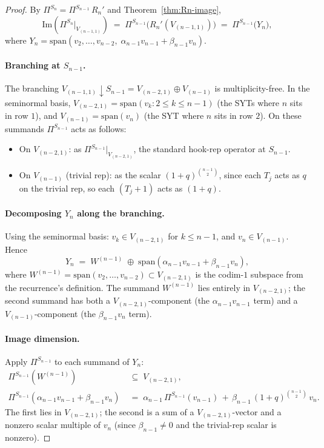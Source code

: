 \documentclass[11pt]{article}
\theoremstyle{definition}
\begin{document}
\begin{proof}
By $\Pi^{S_n} = \Pi^{S_{n-1}}\, R_n'$ and Theorem~\ref{thm:Rn-image},
\[
   \mathrm{Im}(\Pi^{S_n}|_{V_{(n-1,1)}})
     \;=\; \Pi^{S_{n-1}}\bigl(R_n'(V_{(n-1,1)})\bigr)
     \;=\; \Pi^{S_{n-1}}\bigl(Y_n\bigr),
\]
where $Y_n = \mathrm{span}(v_2, \ldots, v_{n-2},\;
                          \alpha_{n-1} v_{n-1} + \beta_{n-1} v_n)$.

\paragraph{Branching at $S_{n-1}$.}
The branching $V_{(n-1,1)} \downarrow S_{n-1}
= V_{(n-2,1)} \oplus V_{(n-1)}$ is multiplicity-free. In the seminormal
basis, $V_{(n-2,1)} = \mathrm{span}(v_k : 2 \le k \le n-1)$ (the SYTs
where $n$ sits in row $1$), and $V_{(n-1)} = \mathrm{span}(v_n)$ (the
SYT where $n$ sits in row $2$). On these summands $\Pi^{S_{n-1}}$ acts
as follows:
\begin{itemize}[topsep=0.3em,itemsep=0.2em,leftmargin=2em]
\item On $V_{(n-2,1)}$: as $\Pi^{S_{n-1}}|_{V_{(n-2,1)}}$, the standard
  hook-rep operator at $S_{n-1}$.
\item On $V_{(n-1)}$ (trivial rep): as the scalar
  $(1{+}q)^{\binom{n-1}{2}}$, since each $T_j$ acts as $q$ on the trivial
  rep, so each $(T_j{+}1)$ acts as $(1{+}q)$.
\end{itemize}

\paragraph{Decomposing $Y_n$ along the branching.}
Using the seminormal basis: $v_k \in V_{(n-2,1)}$ for $k \le n-1$, and
$v_n \in V_{(n-1)}$. Hence
\[
   Y_n \;=\; W^{(n-1)} \;\oplus\;
       \mathrm{span}(\alpha_{n-1} v_{n-1} + \beta_{n-1} v_n),
\]
where $W^{(n-1)} = \mathrm{span}(v_2, \ldots, v_{n-2}) \subset V_{(n-2,1)}$
is the codim-$1$ subspace from the recurrence's definition.
The summand $W^{(n-1)}$ lies entirely in $V_{(n-2,1)}$; the second
summand has both a $V_{(n-2,1)}$-component (the $\alpha_{n-1} v_{n-1}$
term) and a $V_{(n-1)}$-component (the $\beta_{n-1} v_n$ term).

\paragraph{Image dimension.}
Apply $\Pi^{S_{n-1}}$ to each summand of $Y_n$:
\begin{align*}
   \Pi^{S_{n-1}}(W^{(n-1)})
     &\;\subseteq\; V_{(n-2,1)}, \\
   \Pi^{S_{n-1}}(\alpha_{n-1} v_{n-1} + \beta_{n-1} v_n)
     &\;=\; \alpha_{n-1}\, \Pi^{S_{n-1}}(v_{n-1})
       \,+\, \beta_{n-1}\,(1{+}q)^{\binom{n-1}{2}}\, v_n.
\end{align*}
The first lies in $V_{(n-2,1)}$; the second is a sum of a
$V_{(n-2,1)}$-vector and a nonzero scalar multiple of $v_n$
(since $\beta_{n-1} \ne 0$ and the trivial-rep scalar is nonzero).


\end{proof}
\end{document}
